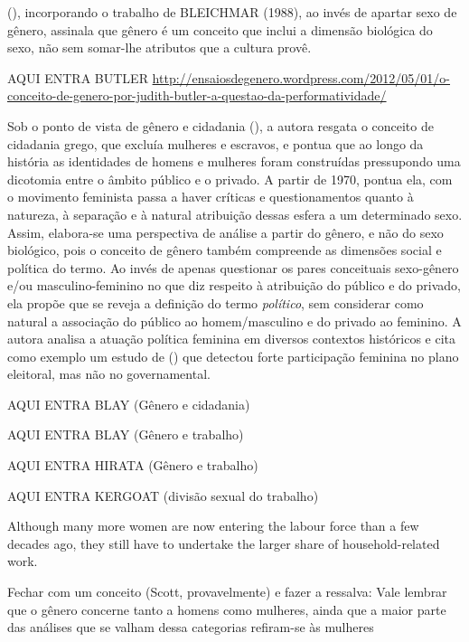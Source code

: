  (\citeyear{KEHL1998}), incorporando o trabalho de BLEICHMAR (1988), ao invés de apartar sexo de gênero, assinala que gênero é um conceito que inclui a dimensão biológica do sexo, não sem somar-lhe atributos que a cultura provê.

AQUI ENTRA BUTLER
\url{http://ensaiosdegenero.wordpress.com/2012/05/01/o-conceito-de-genero-por-judith-butler-a-questao-da-performatividade/}

Sob o ponto de vista de gênero e cidadania (\citeyear{BRITO2001}), a autora resgata o conceito de cidadania grego, que excluía mulheres e escravos, e pontua que ao longo da história as identidades de homens e mulheres foram construídas pressupondo uma dicotomia entre o âmbito público e o privado. A partir de 1970, pontua ela, com o movimento feminista passa a haver críticas e questionamentos quanto à natureza, à separação e à natural atribuição dessas esfera a um determinado sexo. Assim, elabora-se uma perspectiva de análise a partir do gênero, e não do sexo biológico, pois o conceito de gênero também compreende as dimensões social e política do termo. Ao invés de apenas questionar os pares conceituais sexo-gênero e/ou masculino-feminino no que diz respeito à atribuição do público e do privado, ela propõe que se reveja a definição do termo \emph{político}, sem considerar como natural a associação do público ao homem/masculino e do privado ao feminino. A autora analisa a atuação política feminina em diversos contextos históricos e cita como exemplo um estudo de  (\citeyear{DUVERGER1955}) que detectou forte participação feminina no plano eleitoral, mas não no governamental.

AQUI ENTRA BLAY (Gênero e cidadania)

AQUI ENTRA BLAY (Gênero e trabalho)

AQUI ENTRA HIRATA (Gênero e trabalho)

AQUI ENTRA KERGOAT (divisão sexual do trabalho)


Although many more women are now entering the labour force than a few decades ago, they still have to undertake the larger share of household-related work.
\cite{BEST2005}


Fechar com um conceito (Scott, provavelmente) e fazer a ressalva:
Vale lembrar que o gênero concerne tanto a homens como mulheres, ainda que a maior parte das análises que se valham dessa categorias refiram-se às mulheres \cite{MORAES1998}








